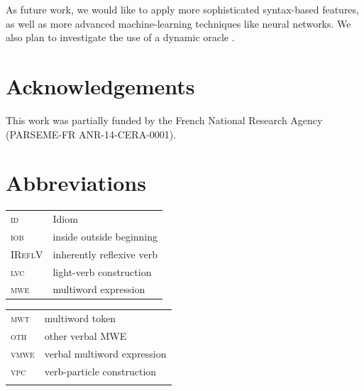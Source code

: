 \documentclass[output=paper,modfonts]{langscibook}
\begin{document}
\newpage
As future work, we would like to apply more sophisticated syntax-based features, as well as more advanced machine-learning techniques like neural networks. We also plan to investigate the use of a dynamic oracle \citep{goldberg:2012}.
\section*{Acknowledgements}
This work was partially funded by the French National Research Agency\\ (PARSEME-FR ANR-14-CERA-0001).

\section*{Abbreviations}

\begin{tabularx}{.49\textwidth}{ll}
\textsc{id} & Idiom\\ 
\textsc{iob}& inside outside beginning\\ 
\textsc{IReflV} & inherently reflexive verb  \\
\textsc{lvc} & light-verb construction  \\
\textsc{mwe} & multiword expression  \\
\end{tabularx}
\begin{tabularx}{.49\textwidth}{ll}
\textsc{mwt} & multiword token  \\
\textsc{oth} & other verbal MWE \\
\textsc{vmwe} & verbal multiword expression \\
\textsc{vpc} & verb-particle construction  \\ 
\\
\end{tabularx}
\largerpage
 
{\sloppy
\printbibliography[heading=subbibliography,notkeyword=this]
}
\end{document}
